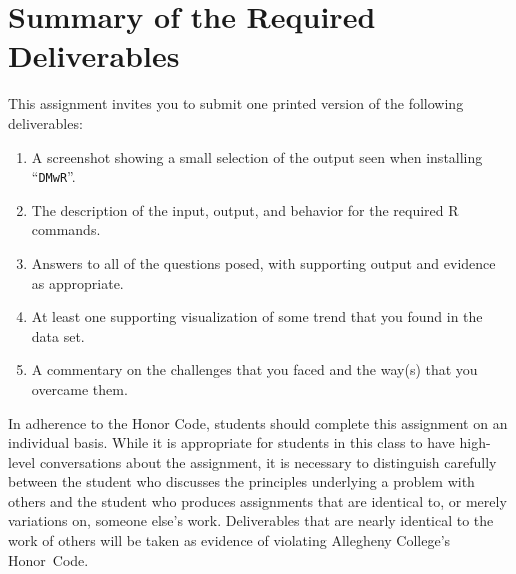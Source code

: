 \section*{Summary of the Required Deliverables}

  This assignment invites you to submit one printed version of the following deliverables:

  \vspace*{-.05in}
  \begin{enumerate}
    \setlength{\itemsep}{0pt}
    \item A screenshot showing a small selection of the output seen when installing ``{\tt DMwR}''.
    \item The description of the input, output, and behavior for the required R commands.
    \item Answers to all of the questions posed, with supporting output and evidence as appropriate. 
    \item At least one supporting visualization of some trend that you found in the data set. 
    \item A commentary on the challenges that you faced and the way(s) that you overcame them.
  \end{enumerate}

\vspace*{-.1in} 

In adherence to the Honor Code, students should complete this assignment on an individual basis. While it is appropriate
for students in this class to have high-level conversations about the assignment, it is necessary to distinguish
carefully between the student who discusses the principles underlying a problem with others and the student who produces
assignments that are identical to, or merely variations on, someone else's work.  Deliverables that are nearly identical
to the work of others will be taken as evidence of violating Allegheny College's \mbox{Honor Code}.






